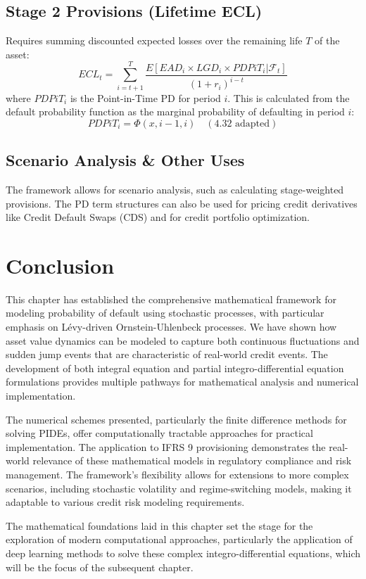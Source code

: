 \documentclass[11pt,twoside,openright]{report}
\begin{document}
\subsection{Stage 2 Provisions (Lifetime ECL)}
Requires summing discounted expected losses over the remaining life $T$ of the asset:
$$ ECL_t = \sum_{i=t+1}^{T} \frac{E[EAD_i \times LGD_i \times PDPiT_i | \mathcal{F}_t]}{(1+r_i)^{i-t}} $$
where $PDPiT_i$ is the Point-in-Time PD for period $i$. This is calculated from the default probability function as the marginal probability of defaulting in period $i$:
$$ PDPiT_i = \Phi(x, i-1, i) \quad (4.32 \text{ adapted}) $$


\subsection{Scenario Analysis \& Other Uses}
The framework allows for scenario analysis, such as calculating stage-weighted provisions. The PD term structures can also be used for pricing credit derivatives like Credit Default Swaps (CDS) and for credit portfolio optimization.

\section{Conclusion}
\label{sec:conclusion_chapter2}

This chapter has established the comprehensive mathematical framework for modeling probability of default using stochastic processes, with particular emphasis on Lévy-driven Ornstein-Uhlenbeck processes. We have shown how asset value dynamics can be modeled to capture both continuous fluctuations and sudden jump events that are characteristic of real-world credit events. The development of both integral equation and partial integro-differential equation formulations provides multiple pathways for mathematical analysis and numerical implementation.

The numerical schemes presented, particularly the finite difference methods for solving PIDEs, offer computationally tractable approaches for practical implementation. The application to IFRS 9 provisioning demonstrates the real-world relevance of these mathematical models in regulatory compliance and risk management. The framework's flexibility allows for extensions to more complex scenarios, including stochastic volatility and regime-switching models, making it adaptable to various credit risk modeling requirements.

The mathematical foundations laid in this chapter set the stage for the exploration of modern computational approaches, particularly the application of deep learning methods to solve these complex integro-differential equations, which will be the focus of the subsequent chapter.
\end{document}
